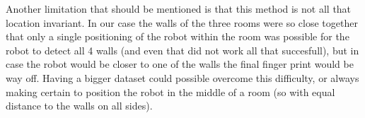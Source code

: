 \documentclass[a4paper, 20pt]{article}
\begin{document}
Another limitation that should be mentioned is that this method is not all that
location invariant. In our case the walls of the three rooms were so close
together that only a single positioning of the robot within the room was
possible for the robot to detect all 4 walls (and even that did not work all
that succesfull), but in case the robot would be closer to one of the walls the
final finger print would be way off. Having a bigger dataset could possible
overcome this difficulty, or always making certain to position the robot  in the
middle of a room (so with equal distance to the walls on all sides).
\end{document}
